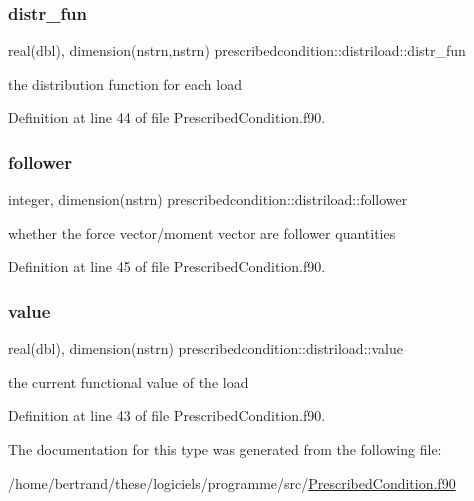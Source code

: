 \subsubsection{\texorpdfstring{distr\+\_\+fun}{distr\_fun}}
{\footnotesize\ttfamily real(dbl), dimension(nstrn,nstrn) prescribedcondition\+::distriload\+::distr\+\_\+fun\hspace{0.3cm}{\ttfamily [private]}}



the distribution function for each load 



Definition at line 44 of file Prescribed\+Condition.\+f90.

\mbox{\label{structprescribedcondition_1_1distriload_a476acfacfaac7a9d8ebaf6ce371279ff}} 
\subsubsection{\texorpdfstring{follower}{follower}}
{\footnotesize\ttfamily integer, dimension(nstrn) prescribedcondition\+::distriload\+::follower\hspace{0.3cm}{\ttfamily [private]}}



whether the force vector/moment vector are follower quantities 



Definition at line 45 of file Prescribed\+Condition.\+f90.

\mbox{\label{structprescribedcondition_1_1distriload_a32fb9fe519f0164a70313c8e7627976b}} 
\subsubsection{\texorpdfstring{value}{value}}
{\footnotesize\ttfamily real(dbl), dimension(nstrn) prescribedcondition\+::distriload\+::value\hspace{0.3cm}{\ttfamily [private]}}



the current functional value of the load 



Definition at line 43 of file Prescribed\+Condition.\+f90.



The documentation for this type was generated from the following file\+:\begin{DoxyCompactItemize}
\item 
/home/bertrand/these/logiciels/programme/src/\hyperlink{_prescribed_condition_8f90}{Prescribed\+Condition.\+f90}\end{DoxyCompactItemize}
